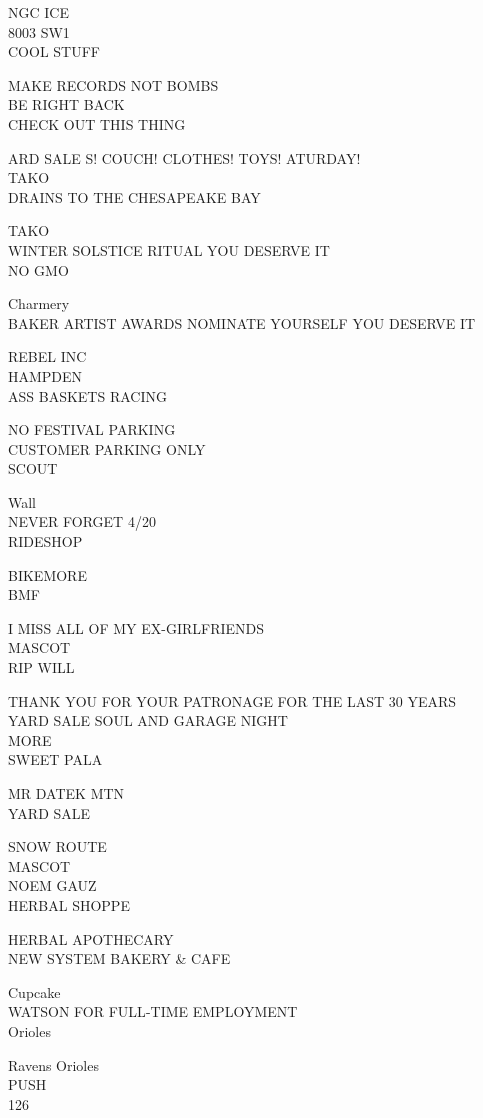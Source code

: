 \documentclass[10pt,letterpaper]{article}
\begin{document}
NGC ICE\\
8003 SW1\\
COOL STUFF

MAKE RECORDS NOT BOMBS\\
BE RIGHT BACK\\
CHECK OUT THIS THING

ARD SALE S! COUCH! CLOTHES! TOYS! ATURDAY!\\
TAKO\\
DRAINS TO THE CHESAPEAKE BAY

TAKO\\
WINTER SOLSTICE RITUAL YOU DESERVE IT\\
NO GMO

Charmery\\
BAKER ARTIST AWARDS NOMINATE YOURSELF YOU DESERVE IT

REBEL INC\\
HAMPDEN\\
ASS BASKETS RACING

NO FESTIVAL PARKING\\
CUSTOMER PARKING ONLY\\
SCOUT

Wall\\
NEVER FORGET 4/20\\
RIDESHOP

BIKEMORE\\
BMF

I MISS ALL OF MY EX{-}GIRLFRIENDS\\
MASCOT\\
RIP WILL

THANK YOU FOR YOUR PATRONAGE FOR THE LAST 30 YEARS\\
YARD SALE SOUL AND GARAGE NIGHT\\
MORE\\
SWEET PALA

MR DATEK MTN\\
YARD SALE

SNOW ROUTE\\
MASCOT\\
NOEM GAUZ\\
HERBAL SHOPPE

HERBAL APOTHECARY\\
NEW SYSTEM BAKERY \& CAFE

Cupcake\\
WATSON FOR FULL{-}TIME EMPLOYMENT\\
Orioles

Ravens Orioles\\
PUSH\\
126
\end{document}
